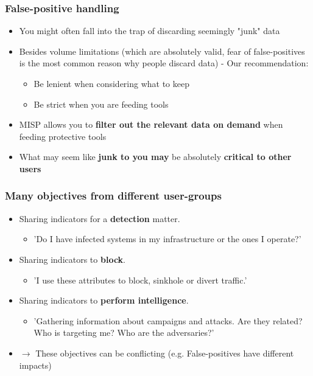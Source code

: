 \begin{frame}
\frametitle{False-positive handling}
\begin{itemize}
	\item You might often fall into the trap of discarding seemingly "junk" data
	\item Besides volume limitations (which are absolutely valid, fear of false-positives is the most common reason why people discard data) - Our recommendation:
	\begin{itemize}
		\item Be lenient when considering what to keep
		\item Be strict when you are feeding tools
	\end{itemize}
\item MISP allows you to {\bf filter out the relevant data on demand} when feeding protective tools
\item What may seem like {\bf junk to you may} be absolutely {\bf critical to other users}
\end{itemize}
\end{frame}

\begin{frame}
\frametitle{Many objectives from different user-groups}
        \begin{itemize}
                \item Sharing indicators for a {\bf detection} matter.
                        \begin{itemize}
                                \item 'Do I have infected systems in my infrastructure or the ones I operate?'
                        \end{itemize}
                \item Sharing indicators to {\bf block}.
                        \begin{itemize}
                                \item 'I use these attributes to block, sinkhole or divert traffic.'
                        \end{itemize}
                \item Sharing indicators to {\bf perform intelligence}.
                        \begin{itemize}
                                \item 'Gathering information about campaigns and attacks. Are they related? Who is targeting me? Who are the adversaries?'
                        \end{itemize}
                \item $\rightarrow$ These objectives can be conflicting (e.g. False-positives have different impacts)
        \end{itemize}
\end{frame}

